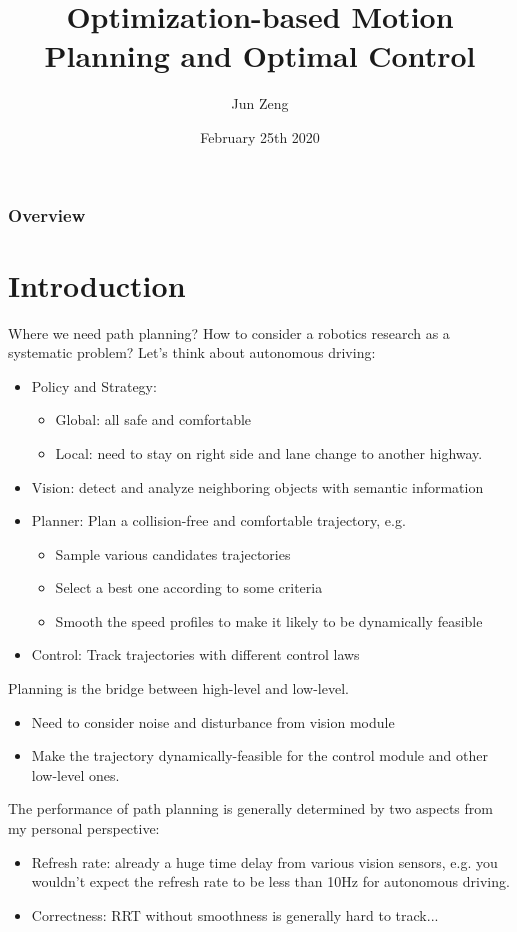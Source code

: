\documentclass{beamer}
\title[] %
{Optimization-based Motion Planning and Optimal Control}
\author[Jun Zeng]{Jun Zeng}
\institute[UC Berkeley]
{
    Department of Mechanical Engineering \\
    University of California, Berkeley
}
\date[February 25th 2020]
{February 25th 2020}
\begin{document}
\frame{\titlepage}

\begin{frame}
	\frametitle{Overview} 
	\tableofcontents
\end{frame}

\section{Introduction}
\begin{frame}{Where we need path planning?}
	How to consider a robotics research as a systematic problem? Let's think about autonomous driving:
	\begin{itemize}
		\item Policy and Strategy:
		\begin{itemize}
			\item Global: all safe and comfortable
			\item Local: need to stay on right side and lane change to another highway. 
		\end{itemize}
		\item Vision: detect and analyze neighboring objects with semantic information
		\item Planner: Plan a collision-free and comfortable trajectory, e.g.
		\begin{itemize}
			\item Sample various candidates trajectories
			\item Select a best one according to some criteria
			\item Smooth the speed profiles to make it likely to be dynamically feasible
		\end{itemize}
		\item Control: Track trajectories with different control laws
	\end{itemize}
\end{frame}

\begin{frame}
	Planning is the bridge between high-level and low-level.
	\begin{itemize}
		\item Need to consider noise and disturbance from vision module
		\item Make the trajectory dynamically-feasible for the control module and other low-level ones.
	\end{itemize}
	The performance of path planning is generally determined by two aspects from my personal perspective:
	\begin{itemize}
		\item Refresh rate: already a huge time delay from various vision sensors, e.g. you wouldn't expect the refresh rate to be less than 10Hz for autonomous driving.
		\item Correctness: RRT without smoothness is generally hard to track...
	\end{itemize}
\end{frame}
\end{document}
